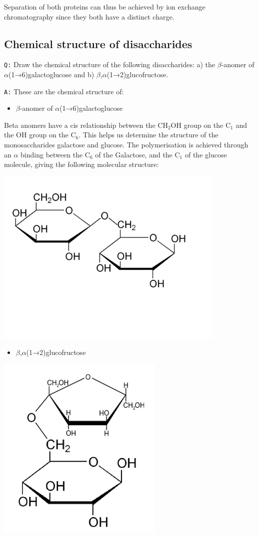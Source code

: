 \documentclass[11pt, a4paper,titlepage]{article}
\begin{document}
Separation of both proteins can thus be achieved by ion exchange
chromatography since they both have a distinct charge.
\subsection{Chemical structure of disaccharides}
\label{sec-2-3}

\texttt{Q:} Draw the chemical structure of the following disaccharides: a)
the $\beta$-anomer of $\alpha$(1→6)galactoglucose and b)
$\beta$,$\alpha$(1→2)glucofructose.

\texttt{A:} These are the chemical structure of:
\begin{itemize}
\item $\beta$-anomer of $\alpha$(1→6)galactoglucose
\end{itemize}

Beta anomers have a cis relationship between the CH$_{2}$OH group on
the C$_{1}$ and the OH group on the C$_{6}$. This helps us determine the
structure of the monosaccharides galactose and glucose. The
polymerisation is achieved through an $\alpha$ binding between the
C$_{6}$ of the Galactose, and the C$_{1}$ of the glucose molecule, giving
the following molecular structure:

\includegraphics[width=11cm]{./Figures/B-A(1-6)GalactoGlucose.pdf}

\begin{itemize}
\item $\beta$,$\alpha$(1→2)glucofructose
\end{itemize}

\includegraphics[width=8cm]{./Figures/BA(1-2)GlucoFructose2.pdf}
\end{document}
